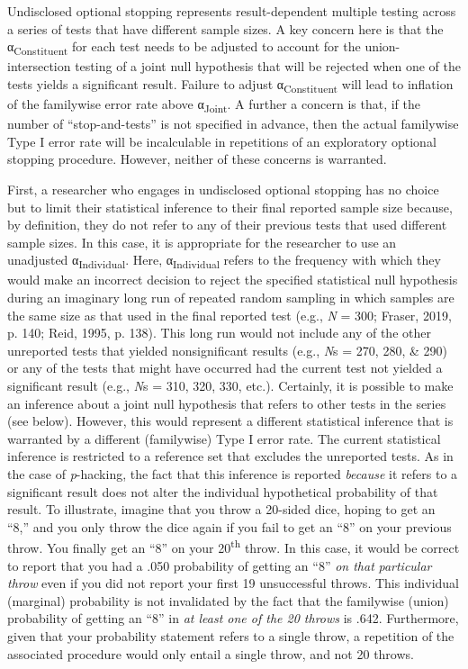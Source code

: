 \documentclass[authordate, empirical]{jote-new-article}
\begin{document}
	Undisclosed optional stopping represents result-dependent multiple testing across a series of tests that have different sample sizes. A key concern here is that the α\textsubscript{Constituent} for each test needs to be adjusted to account for the union-intersection testing of a joint null hypothesis that will be rejected when one of the tests yields a significant result. Failure to adjust α\textsubscript{Constituent} will lead to inflation of the familywise error rate above α\textsubscript{Joint}. A further a concern is that, if the number of “stop-and-tests” is not specified in advance, then the actual familywise Type I error rate will be incalculable in repetitions of an exploratory optional stopping procedure. However, neither of these concerns is warranted.



	First, a researcher who engages in undisclosed optional stopping has no choice but to limit their statistical inference to their final reported sample size because, by definition, they do not refer to any of their previous tests that used different sample sizes. In this case, it is appropriate for the researcher to use an unadjusted α\textsubscript{Individual}. Here, α\textsubscript{Individual} refers to the frequency with which they would make an incorrect decision to reject the specified statistical null hypothesis during an imaginary long run of repeated random sampling in which samples are the same size as that used in the final reported test (e.g., \emph{N} = 300; Fraser, 2019, p. 140; Reid, 1995, p. 138). This long run would not include any of the other unreported tests that yielded nonsignificant results (e.g., \emph{N}s = 270, 280, \& 290) or any of the tests that might have occurred had the current test not yielded a significant result (e.g., \emph{N}s = 310, 320, 330, etc.). Certainly, it is possible to make an inference about a joint null hypothesis that refers to other tests in the series (see below). However, this would represent a different statistical inference that is warranted by a different (familywise) Type I error rate. The current statistical inference is restricted to a reference set that excludes the unreported tests. As in the case of \emph{p}-hacking, the fact that this inference is reported \emph{because} it refers to a significant result does not alter the individual hypothetical probability of that result. To illustrate, imagine that you throw a 20-sided dice, hoping to get an “8,” and you only throw the dice again if you fail to get an “8” on your previous throw. You finally get an “8” on your 20\textsuperscript{th} throw. In this case, it would be correct to report that you had a .050 probability of getting an “8” \emph{on that }\emph{particular throw} even if you did not report your first 19 unsuccessful throws. This individual (marginal) probability is not invalidated by the fact that the familywise (union) probability of getting an “8” in \emph{at least one of the 20 throws} is .642. Furthermore, given that your probability statement refers to a single throw, a repetition of the associated procedure would only entail a single throw, and not 20 throws.
\end{document}
